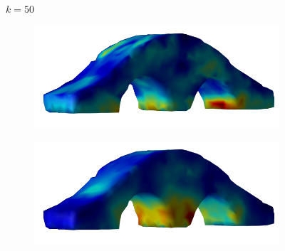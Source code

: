 \documentclass[11pt,titlepage]{article}
\begin{document}
\begin{figure}[!htbp]
\begin{center}
        $k=50$
        \quad
        \begin{subfigure}[b]{0.4\textwidth}
            \centering
            \includegraphics[width=\textwidth]{jacopt_vm/resized/archbridge_tiny_51}
        \end{subfigure}
        \begin{subfigure}[b]{0.4\textwidth}
            \centering
            \includegraphics[width=\textwidth]{soropt_vm/resized/archbridge_tiny_51}
        \end{subfigure}\\ 


\end{center}
\end{figure}
\end{document}
